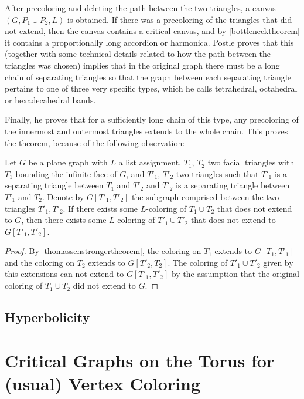 After precoloring and deleting the path between the two triangles, a canvas $(G, P_1 \cup P_2, L)$ is obtained. If there was a precoloring of the triangles that did not extend, then the canvas contains a critical canvas, and by \ref{bottlenecktheorem} it contains a proportionally long accordion or harmonica. Postle proves that this (together with some technical details related to how the path between the triangles was chosen) implies that in the original graph there must be a long chain of separating triangles so that the graph between each separating triangle pertains to one of three very specific types, which he calls tetrahedral, octahedral or hexadecahedral bands. 


Finally, he proves that for a sufficiently long chain of this type, any precoloring of the innermost and outermost triangles extends to the whole chain. This proves the theorem, because of the following observation:

\begin{proposition}
	Let $G$ be a plane graph with $L$ a list assignment, $T_1$, $T_2$ 
	two facial triangles with $T_1$ bounding the infinite face of $G$, 
	and $T'_1$, $T'_2$ two triangles such that $T'_1$ is a separating 
	triangle between $T_1$ and $T'_2$ and $T'_2$ is a separating 
	triangle between $T'_1$ and $T_2$. Denote by $G[T'_1, T'_2]$ the 
	subgraph comprised between the two triangles $T'_1, T'_2$.  
	If there exists some $L$-coloring of $T_1 \cup T_2$ that does not 
	extend to $G$, then there exists some $L$-coloring of $T'_1 \cup T'_2$ 
	that does not extend to $G[T'_1, T'_2]$.
\end{proposition}

\begin{proof}
	By \ref{thomassenstrongertheorem}, the coloring on $T_1$ extends to 
	$G[T_1, T'_1]$ and the coloring on $T_2$ extends to $G[T'_2, T_2]$. 
	The coloring of $T'_1 \cup T'_2$ given by this extensions can not 
	extend to $G[T'_1, T'_2]$ by the assumption that the original coloring 
	of $T_1 \cup T_2$ did not extend to $G$.
\end{proof}

\subsection{Hyperbolicity}

\section{Critical Graphs on the Torus for (usual) Vertex Coloring}

